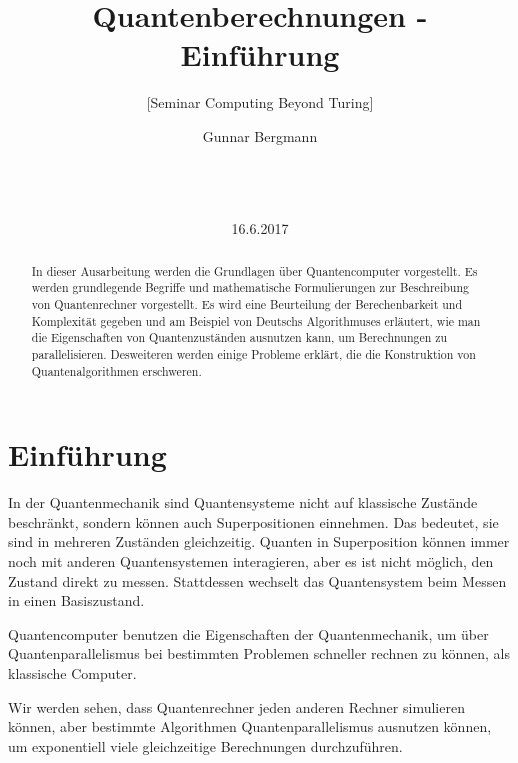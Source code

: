 \documentclass{acm_proc_article-sp}
\begin{document}
\title{Quantenberechnungen - Einführung}
\subtitle{[Seminar Computing Beyond Turing]}
\author{\alignauthor
Gunnar Bergmann\\
       \\ 
       \\
       \\ 
}


\date{16.6.2017}

\maketitle
\begin{abstract}

In dieser Ausarbeitung werden die Grundlagen über Quantencomputer vorgestellt.
Es werden grundlegende Begriffe und mathematische Formulierungen zur Beschreibung von
Quantenrechner vorgestellt.
Es wird eine Beurteilung der Berechenbarkeit und Komplexität gegeben und am Beispiel von 
Deutschs Algorithmuses erläutert, wie man die Eigenschaften von Quantenzuständen ausnutzen kann, um Berechnungen zu parallelisieren.
Desweiteren werden einige Probleme erklärt, die die Konstruktion von Quantenalgorithmen erschweren.

\end{abstract}

\section{Einführung}

In der Quantenmechanik sind Quantensysteme nicht auf klassische Zustände beschränkt, sondern können auch Superpositionen einnehmen.
Das bedeutet, sie sind in mehreren Zuständen gleichzeitig. Quanten in Superposition können immer noch mit anderen
Quantensystemen interagieren, aber es ist nicht möglich, den Zustand direkt zu messen. Stattdessen wechselt das 
Quantensystem beim Messen in einen Basiszustand.

Quantencomputer benutzen die Eigenschaften der Quantenmechanik, um über Quantenparallelismus bei bestimmten Problemen
schneller rechnen zu können, als klassische Computer.

Wir werden sehen, dass Quantenrechner jeden anderen Rechner simulieren können, aber bestimmte Algorithmen Quantenparallelismus ausnutzen können, um exponentiell viele gleichzeitige Berechnungen durchzuführen.
\end{document}
